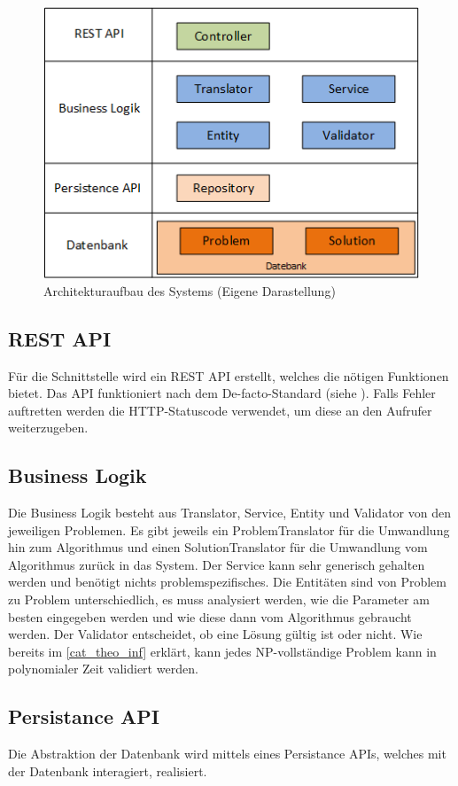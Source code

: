 \begin{figure}[h]
\centering
\includegraphics[scale=0.8]{images/visio/architektur_db.png}
\caption{Architekturaufbau des Systems (Eigene Darastellung)}
\label{fig:architektur}
\end{figure}
 
\FloatBarrier
\subsection{REST API}
Für die Schnittstelle wird ein REST API erstellt, welches die nötigen Funktionen bietet. Das API funktioniert nach dem De-facto-Standard (siehe \cite{wiki_restful}). Falls Fehler auftretten werden die HTTP-Statuscode verwendet, um diese an den Aufrufer weiterzugeben.

\subsection{Business Logik}
Die Business Logik besteht aus Translator, Service, Entity und Validator von den jeweiligen Problemen. Es gibt jeweils ein ProblemTranslator für die Umwandlung hin zum Algorithmus und einen SolutionTranslator für die Umwandlung vom Algorithmus zurück in das System. Der Service kann sehr generisch gehalten werden und benötigt nichts problemspezifisches. Die Entitäten sind von Problem zu Problem unterschiedlich, es muss analysiert werden, wie die Parameter am besten eingegeben werden und wie diese dann vom Algorithmus gebraucht werden. Der Validator entscheidet, ob eine Lösung gültig ist oder nicht. Wie bereits im \autoref{cat_theo_inf} erklärt, kann jedes NP-vollständige Problem kann in polynomialer Zeit validiert werden.

\subsection{Persistance API}
Die Abstraktion der Datenbank wird mittels eines Persistance APIs, welches mit der Datenbank interagiert, realisiert.


